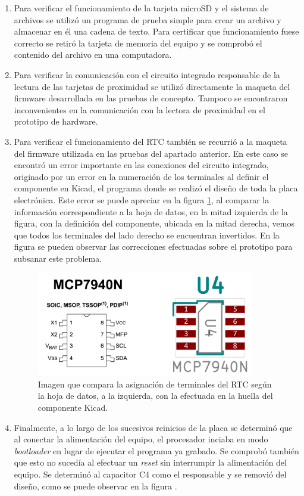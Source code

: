 \begin{enumerate}
	\item Para verificar el funcionamiento de la tarjeta microSD y el sistema de archivos se utilizó un programa de prueba simple para crear un archivo y almacenar en él una cadena de texto. Para certificar que funcionamiento fuese correcto se retiró la tarjeta de memoria del equipo y se comprobó el contenido del archivo en una computadora.
	
	\item Para verificar la comunicación con el circuito integrado responsable de la lectura de las tarjetas de proximidad se utilizó directamente la maqueta del firmware desarrollada en las pruebas de concepto. Tampoco se encontraron inconvenientes en la comunicación con la lectora de proximidad en el prototipo de hardware.
	
	\item Para verificar el funcionamiento del RTC también se recurrió a la maqueta del firmware utilizada en las pruebas del apartado anterior. En este caso se encontró un error importante en las conexiones del circuito integrado, originado por un error en la numeración de los terminales al definir el componente en Kicad, el programa donde se realizó el diseño de toda la placa electrónica. Este error se puede apreciar en la figura \ref{fig:ErrorRTC}, al comparar la información correspondiente a la hoja de datos, en la mitad izquierda de la figura, con la definición del componente, ubicada en la mitad derecha, vemos que todos los terminales del lado derecho se encuentran invertidos. En la figura \label{fig:ErroresPrototipo} se pueden observar las correcciones efectuadas sobre el prototipo para subsanar este problema.
	
\begin{figure}[ht]
	\centering
	\includegraphics[width=0.9\textwidth]{Figures/ErrorHuella.png}
	\caption[Error en la asignacion de terminales del RTC]{Imagen que compara la asignación de terminales del RTC según la hoja de datos, a la izquierda, con la efectuada en la huella del componente Kicad.}
	\label{fig:ErrorRTC}
\end{figure}

	\item Finalmente, a lo largo de los sucesivos reinicios de la placa se determinó que al conectar la alimentación del equipo, el procesador inciaba en modo \emph{bootloader} en lugar de ejecutar el programa ya grabado. Se comprobó también que esto no sucedía al efectuar un \emph{reset} sin interrumpir la alimentación del equipo. Se determinó al capacitor C4 como el responsable y se removió del diseño, como se puede observar en la figura \label{fig:ErroresPrototipo}.
\end{enumerate}

